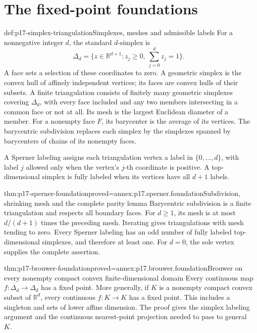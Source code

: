 \section{The fixed-point foundations}

\begin{hbdefinition}{def:p17-simplex-triangulation}{Simplexes, meshes and admissible labels}
For a nonnegative integer \(d\), the standard \(d\)-simplex is
\[
       \Delta_d=\{z\in\mathbb R^{d+1}:z_j\geq0,\ \sum_{j=0}^d z_j=1\}.
\]
A face sets a selection of these coordinates to zero.
A geometric simplex is the convex hull of affinely independent
vertices; its faces are convex hulls of their subsets.
A finite triangulation consists of finitely many geometric simplexes
covering \(\Delta_d\), with every face included and any two members
intersecting in a common face or not at all. Its mesh is the
largest Euclidean diameter of a member.
For a nonempty face \(F\), its barycenter is the average of its
vertices. The barycentric subdivision replaces each simplex by
the simplexes spanned by barycenters of chains of its nonempty faces.

A Sperner labeling assigns each triangulation vertex a label in
\(\{0,\ldots,d\}\), with label \(j\) allowed only when the
vertex's \(j\)-th coordinate is positive. A top-dimensional
simplex is fully labeled when its vertices have all \(d+1\) labels.
\end{hbdefinition}

\begin{hblemma}{thm:p17-sperner-foundation}{proved=annex:p17.sperner.foundation}{Subdivision, shrinking mesh and the complete parity lemma}
Barycentric subdivision is a finite triangulation and respects
all boundary faces. For \(d\geq1\), its mesh is at most
\(d/(d+1)\) times the preceding mesh. Iterating gives
triangulations with mesh tending to zero.
Every Sperner labeling has an odd number of fully labeled
top-dimensional simplexes, and therefore at least one.
For \(d=0\), the sole vertex supplies the complete assertion.
\end{hblemma}

\begin{hbtheorem}{thm:p17-brouwer-foundation}{proved=annex:p17.brouwer.foundation}{Brouwer on every nonempty compact convex finite-dimensional domain}
Every continuous map \(f:\Delta_d\to\Delta_d\) has a fixed point.
More generally, if \(K\) is a nonempty compact convex subset of
\(\mathbb R^d\), every continuous \(f:K\to K\) has a fixed point.
This includes a singleton and sets of lower affine dimension.
The proof gives the simplex labeling argument and the continuous
nearest-point projection needed to pass to general \(K\).
\end{hbtheorem}

